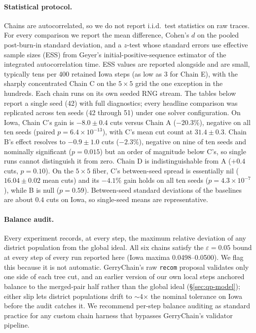 \documentclass[11pt]{article}
\begin{document}
\paragraph{Statistical protocol.} Chains are autocorrelated, so we do
not report i.i.d.\ test statistics on raw traces. For every
comparison we report the mean difference, Cohen's $d$ on the pooled
post-burn-in standard deviation, and a $z$-test whose standard errors
use effective sample sizes (ESS) from Geyer's initial-positive-sequence
estimator of the integrated autocorrelation time. ESS values are
reported alongside and are small, typically tens per 400 retained
Iowa steps (as low as 3 for Chain E), with the sharply concentrated
Chain C on the $5 \times 5$ grid the one exception in the hundreds.
Each chain runs on its own seeded RNG stream. The tables below report
a single seed (42) with full diagnostics; every headline comparison
was replicated across ten seeds (42 through 51) under one solver
configuration. On Iowa, Chain C's gain is $-8.0 \pm 0.4$ cuts versus
Chain A ($-20.3\%$), negative on all ten seeds (paired
$p = 6.4 \times 10^{-13}$), with C's mean cut count at
$31.4 \pm 0.3$. Chain B's effect resolves to $-0.9 \pm 1.0$ cuts
($-2.3\%$), negative on nine of ten seeds and nominally significant
($p = 0.015$) but an order of magnitude below C's, so single runs
cannot distinguish it from zero. Chain D is indistinguishable from A
($+0.4$ cuts, $p = 0.10$). On the $5 \times 5$ fiber, C's between-seed
spread is essentially nil ($16.04 \pm 0.02$ mean cuts) and its
$-4.1\%$ gain holds on all ten seeds ($p = 4.3 \times 10^{-7}$),
while B is null ($p = 0.59$). Between-seed standard deviations of the
baselines are about $0.4$ cuts on Iowa, so single-seed means are
representative.

\paragraph{Balance audit.}\label{sec:exp-balance} Every experiment
records, at every step, the maximum relative deviation of any district
population from the global ideal. All six chains satisfy the
$\varepsilon = 0.05$ bound at every step of every run reported here
(Iowa maxima 0.0498--0.0500). We flag this because it is not automatic.
GerryChain's raw \texttt{recom} proposal validates only one side of
each tree cut, and an earlier version of our own local steps anchored
balance to the merged-pair half rather than the global ideal
(\S\ref{sec:qp-model}); either slip lets district populations drift
to $\sim$4$\times$ the nominal tolerance on Iowa before the audit
catches it. We recommend per-step balance auditing as standard
practice for any custom chain harness that bypasses GerryChain's
validator pipeline.
\end{document}
